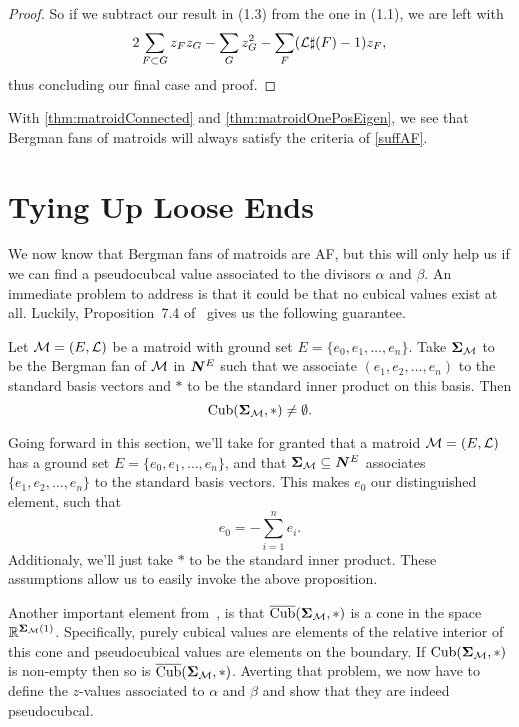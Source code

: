 \documentclass[12pt,oneside]{../../sfsuthesis}
\begin{document}
\begin{proof}
    So if we subtract our result in (1.3) from the one in (1.1), we are left with
    \[
        2\sum_{F \subset G} z_F z_G - \sum_G z^2_G - \sum_F (\mathcal{L}\sharp(F) - 1)z_F,
    \]
    thus concluding our final case and proof.

\end{proof}

With \th\ref{thm:matroidConnected} and \th\ref{thm:matroidOnePosEigen}, we see that Bergman fans of matroids will always satisfy the criteria of \th\ref{suffAF}.

\section{Tying Up Loose Ends}

We now know that Bergman fans of matroids are AF, but this will only help us if we can find a pseudocubcal value associated to the divisors \( \alpha \) and \( \beta \).
An immediate problem to address is that it could be that no cubical values exist at all.
Luckily, Proposition~7.4 of~\cite{nathansonTropicalFansNormal2023} gives us the following guarantee.
\begin{proposition}\th\label{thm:existCubical}
    Let \( \mathcal{M} = (E, \mathcal{L}) \) be a matroid with ground set \( E = \{ e_0, e_1, \dots, e_n \} \).
    Take \( \bm{\Sigma}_{\mathcal{M}} \) to be the Bergman fan of \( \mathcal{M} \) in \( \bm{N}^E \) such that we associate \( (e_1, e_2, \dots, e_n) \) to the standard basis vectors and \( \ast \) to be the standard inner product on this basis.
    Then
    \[
        \operatorname{Cub}(\bm{\Sigma}_{\mathcal{M}}, \ast) \neq \emptyset.
    \]
\end{proposition}
Going forward in this section, we'll take for granted that a matroid \( \mathcal{M} = (E, \mathcal{L}) \) has a ground set \( E = \{ e_0, e_1, \dots, e_n \} \), and that \( \bm{\Sigma}_{\mathcal{M}} \subseteq \bm{N}^E \) associates \( \{e_1, e_2, \dots, e_n\} \) to the standard basis vectors.
This makes \( e_0 \) our distinguished element, such that
\[
    e_0 = -\sum_{i=1}^n e_i.
\]
Additionaly, we'll just take \( \ast \) to be the standard inner product.
These assumptions allow us to easily invoke the above proposition.

Another important element from~\cite{nathansonTropicalFansNormal2023}, is that \( \operatorname{\overline{Cub}}(\bm{\Sigma}_{\mathcal{M}}, \ast) \) is a cone in the space \( \mathbb{R}^{\bm{\Sigma}_{\mathcal{M}}(1)} \).
Specifically, purely cubical values are elements of the relative interior of this cone and pseudocubical values are elements on the boundary.
If \( \operatorname{Cub}(\bm{\Sigma}_{\mathcal{M}}, \ast) \) is non-empty then so is \( \operatorname{\overline{Cub}}(\bm{\Sigma}_{\mathcal{M}}, \ast) \).
Averting that problem, we now have to define the \( z \)-values associated to \( \alpha \) and \( \beta \) and show that they are indeed pseudocubcal.
\end{document}
